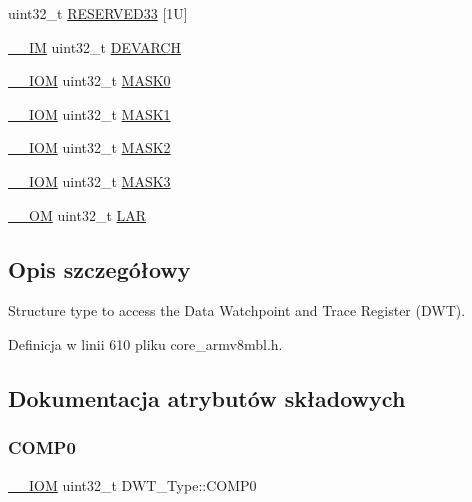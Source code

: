 \begin{DoxyCompactItemize}
uint32\+\_\+t \hyperlink{struct_d_w_t___type_a23488c27be43c80c8c1dfd17aac9c28d}{R\+E\+S\+E\+R\+V\+E\+D33} \mbox{[}1\+U\mbox{]}
\item 
\hyperlink{core__sc300_8h_a4cc1649793116d7c2d8afce7a4ffce43}{\+\_\+\+\_\+\+IM} uint32\+\_\+t \hyperlink{struct_d_w_t___type_ae60dbff3143d15cd04ac984084d8fbc7}{D\+E\+V\+A\+R\+CH}
\item 
\hyperlink{core__sc300_8h_ab6caba5853a60a17e8e04499b52bf691}{\+\_\+\+\_\+\+I\+OM} uint32\+\_\+t \hyperlink{struct_d_w_t___type_a821eb5e71f340ec077efc064cfc567db}{M\+A\+S\+K0}
\item 
\hyperlink{core__sc300_8h_ab6caba5853a60a17e8e04499b52bf691}{\+\_\+\+\_\+\+I\+OM} uint32\+\_\+t \hyperlink{struct_d_w_t___type_aabf94936c9340e62fed836dcfb152405}{M\+A\+S\+K1}
\item 
\hyperlink{core__sc300_8h_ab6caba5853a60a17e8e04499b52bf691}{\+\_\+\+\_\+\+I\+OM} uint32\+\_\+t \hyperlink{struct_d_w_t___type_a00ac4d830dfe0070a656cda9baed170f}{M\+A\+S\+K2}
\item 
\hyperlink{core__sc300_8h_ab6caba5853a60a17e8e04499b52bf691}{\+\_\+\+\_\+\+I\+OM} uint32\+\_\+t \hyperlink{struct_d_w_t___type_a2a509d8505c37a3b64f6b24993df5f3f}{M\+A\+S\+K3}
\item 
\hyperlink{core__sc300_8h_a0ea2009ed8fd9ef35b48708280fdb758}{\+\_\+\+\_\+\+OM} uint32\+\_\+t \hyperlink{struct_d_w_t___type_a4b8037802a3b25e367f0977d86f754ad}{L\+AR}
\end{DoxyCompactItemize}


\subsection{Opis szczegółowy}
Structure type to access the Data Watchpoint and Trace Register (D\+WT). 

Definicja w linii 610 pliku core\+\_\+armv8mbl.\+h.



\subsection{Dokumentacja atrybutów składowych}
\mbox{\label{struct_d_w_t___type_a61c2965af5bc0643f9af65620b0e67c9}} 
\subsubsection{\texorpdfstring{C\+O\+M\+P0}{COMP0}}
{\footnotesize\ttfamily \hyperlink{core__sc300_8h_ab6caba5853a60a17e8e04499b52bf691}{\+\_\+\+\_\+\+I\+OM} uint32\+\_\+t D\+W\+T\+\_\+\+Type\+::\+C\+O\+M\+P0}

